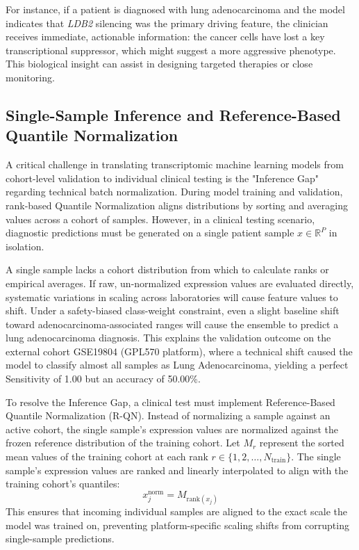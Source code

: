 \documentclass[journal,10pt]{IEEEtran}
\begin{document}
For instance, if a patient is diagnosed with lung adenocarcinoma and the model indicates that \textit{LDB2} silencing was the primary driving feature, the clinician receives immediate, actionable information: the cancer cells have lost a key transcriptional suppressor, which might suggest a more aggressive phenotype. This biological insight can assist in designing targeted therapies or close monitoring.

\subsection{Single-Sample Inference and Reference-Based Quantile Normalization}
A critical challenge in translating transcriptomic machine learning models from cohort-level validation to individual clinical testing is the "Inference Gap" regarding technical batch normalization. During model training and validation, rank-based Quantile Normalization aligns distributions by sorting and averaging values across a cohort of samples. However, in a clinical testing scenario, diagnostic predictions must be generated on a single patient sample $x \in \mathbb{R}^P$ in isolation.

A single sample lacks a cohort distribution from which to calculate ranks or empirical averages. If raw, un-normalized expression values are evaluated directly, systematic variations in scaling across laboratories will cause feature values to shift. Under a safety-biased class-weight constraint, even a slight baseline shift toward adenocarcinoma-associated ranges will cause the ensemble to predict a lung adenocarcinoma diagnosis. This explains the validation outcome on the external cohort GSE19804 (GPL570 platform), where a technical shift caused the model to classify almost all samples as Lung Adenocarcinoma, yielding a perfect Sensitivity of 1.00 but an accuracy of 50.00\%.

To resolve the Inference Gap, a clinical test must implement Reference-Based Quantile Normalization (R-QN). Instead of normalizing a sample against an active cohort, the single sample's expression values are normalized against the frozen reference distribution of the training cohort. Let $M_r$ represent the sorted mean values of the training cohort at each rank $r \in \{1, 2, \dots, N_{\text{train}}\}$. The single sample's expression values are ranked and linearly interpolated to align with the training cohort's quantiles:
\begin{equation}
x^{\text{norm}}_j = M_{\text{rank}(x_j)}
\end{equation}
This ensures that incoming individual samples are aligned to the exact scale the model was trained on, preventing platform-specific scaling shifts from corrupting single-sample predictions.
\end{document}
